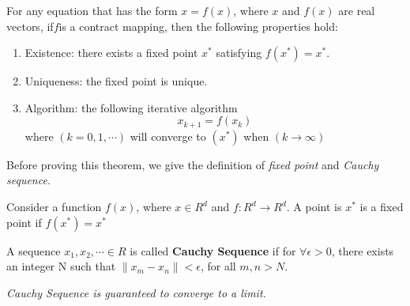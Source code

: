 \begin{theorem}\label{thm:cm1}
	For any equation that has the form $x=f(x)$, where $x$ and $f(x)$ are real vectors, if$f$is a contract mapping, then the following properties hold:
	\begin{enumerate}
		\item Existence: there exists a fixed point $x^{*}$ satisfying $f(x^{*})=x^{*}$.
		\item Uniqueness: the fixed point is unique.
		\item Algorithm: the following iterative algorithm
		      \begin{equation}
			      x_{k+1}=f(x_{k})
		      \end{equation}
		      where $(k=0,1,\cdots)$ will converge to $(x^{*})$ when $(k \to \infty)$
	\end{enumerate}
\end{theorem}

Before proving this theorem, we give the definition of \emph{fixed point} and \emph{Cauchy sequence}.
\begin{definition}
	Consider a function $f(x)$, where $x \in R^{d}$ and $f: R^d \to R^d$. A point is  $x^{*}$ is a fixed point if  $f(x^*)=x^*$
\end{definition}

\begin{definition}
	A sequence $x_1,x_2,\cdots \in R$ is called \textbf{Cauchy Sequence} if for $\forall \epsilon >0$, there exists an integer N such that $\|x_m-x_n\|<\epsilon$, for all $m,n>N$. \par
	\emph{Cauchy Sequence is guaranteed to converge to a limit.}
\end{definition}

